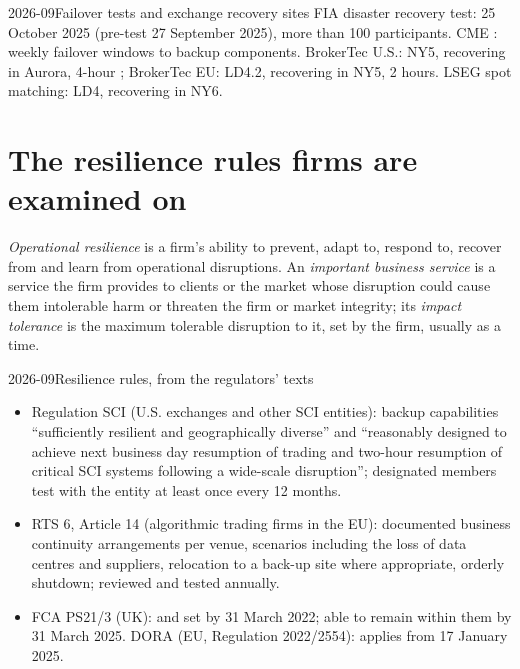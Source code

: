 \begin{dated}{2026-09}{Failover tests and exchange recovery sites}\label{dat:nw:disaster-recovery-and-regulatory-requirements:tests}
FIA disaster recovery test: 25 October 2025 (pre-test 27 September 2025), more than 100 participants. CME :
weekly failover windows to backup components. BrokerTec U.S.: NY5, recovering in Aurora, 4-hour ; BrokerTec
EU: LD4.2, recovering in NY5, 2 hours. LSEG spot matching: LD4, recovering in NY6.
\end{dated}

\section{The resilience rules firms are examined on}

\begin{definition}\label{def:nw:disaster-recovery-and-regulatory-requirements:resilience}
\emph{Operational resilience} is a firm's ability to prevent, adapt to, respond to, recover from and
learn from operational disruptions. An \emph{important business service} is a service the firm
provides to clients or the market whose disruption could cause them intolerable harm or threaten the firm or market integrity; its
\emph{impact tolerance} is the maximum tolerable disruption to it, set by the firm, usually as a time.
\end{definition}

\begin{dated}{2026-09}{Resilience rules, from the regulators' texts}\label{dat:nw:disaster-recovery-and-regulatory-requirements:rules}
\begin{itemize}
\item Regulation SCI (U.S. exchanges and other SCI entities): backup capabilities ``sufficiently resilient and geographically diverse''
  and ``reasonably designed to achieve next business day resumption of trading and two-hour resumption of critical SCI systems
  following a wide-scale disruption''; designated members test with the entity at least once every 12 months.
\item RTS 6, Article 14 (algorithmic trading firms in the EU): documented business continuity arrangements per venue, scenarios
  including the loss of data centres and suppliers, relocation to a back-up site where appropriate, orderly shutdown; reviewed and
  tested annually.
\item FCA PS21/3 (UK):  and  set by 31 March 2022; able to remain within them by
  31 March 2025. DORA (EU, Regulation 2022/2554): applies from 17 January 2025.
\end{itemize}
\end{dated}

